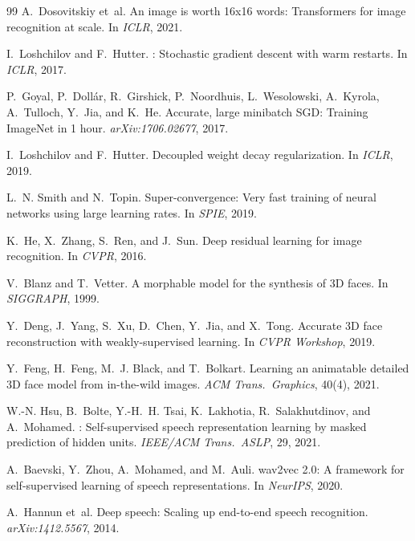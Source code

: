 \documentclass[10pt,twocolumn,letterpaper]{article}
\begin{document}
{\begin{thebibliography}{99}
A.~Dosovitskiy et~al.
\newblock An image is worth {16x16} words: Transformers for image recognition at scale.
\newblock In \emph{ICLR}, 2021.

I.~Loshchilov and F.~Hutter.
: Stochastic gradient descent with warm restarts.
\newblock In \emph{ICLR}, 2017.

P.~Goyal, P.~Doll{\'a}r, R.~Girshick, P.~Noordhuis, L.~Wesolowski, A.~Kyrola, A.~Tulloch, Y.~Jia, and K.~He.
\newblock Accurate, large minibatch {SGD}: Training {ImageNet} in 1 hour.
\newblock \emph{arXiv:1706.02677}, 2017.

I.~Loshchilov and F.~Hutter.
\newblock Decoupled weight decay regularization.
\newblock In \emph{ICLR}, 2019.

L.~N. Smith and N.~Topin.
\newblock Super-convergence: Very fast training of neural networks using large learning rates.
\newblock In \emph{SPIE}, 2019.

K.~He, X.~Zhang, S.~Ren, and J.~Sun.
\newblock Deep residual learning for image recognition.
\newblock In \emph{CVPR}, 2016.

V.~Blanz and T.~Vetter.
\newblock A morphable model for the synthesis of {3D} faces.
\newblock In \emph{SIGGRAPH}, 1999.

Y.~Deng, J.~Yang, S.~Xu, D.~Chen, Y.~Jia, and X.~Tong.
\newblock Accurate {3D} face reconstruction with weakly-supervised learning.
\newblock In \emph{CVPR Workshop}, 2019.

Y.~Feng, H.~Feng, M.~J. Black, and T.~Bolkart.
\newblock Learning an animatable detailed {3D} face model from in-the-wild images.
\newblock \emph{ACM Trans.\ Graphics}, 40(4), 2021.

W.-N. Hsu, B.~Bolte, Y.-H.~H. Tsai, K.~Lakhotia, R.~Salakhutdinov, and A.~Mohamed.
: Self-supervised speech representation learning by masked prediction of hidden units.
\newblock \emph{IEEE/ACM Trans.\ ASLP}, 29, 2021.

A.~Baevski, Y.~Zhou, A.~Mohamed, and M.~Auli.
\newblock wav2vec 2.0: A framework for self-supervised learning of speech representations.
\newblock In \emph{NeurIPS}, 2020.

A.~Hannun et~al.
\newblock Deep speech: Scaling up end-to-end speech recognition.
\newblock \emph{arXiv:1412.5567}, 2014.


\end{thebibliography}}
\end{document}
